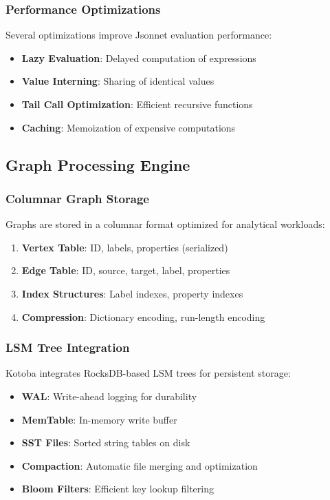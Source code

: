 \documentclass[11pt,a4paper]{article}
\begin{document}
\subsubsection{Performance Optimizations}
\label{subsubsec:jsonnet_performance}

Several optimizations improve Jsonnet evaluation performance:

\begin{itemize}
\item \textbf{Lazy Evaluation}: Delayed computation of expressions
\item \textbf{Value Interning}: Sharing of identical values
\item \textbf{Tail Call Optimization}: Efficient recursive functions
\item \textbf{Caching}: Memoization of expensive computations
\end{itemize}

\subsection{Graph Processing Engine}
\label{subsec:graph_engine}

\subsubsection{Columnar Graph Storage}
\label{subsubsec:columnar_storage}

Graphs are stored in a columnar format optimized for analytical workloads:

\begin{enumerate}
\item \textbf{Vertex Table}: ID, labels, properties (serialized)
\item \textbf{Edge Table}: ID, source, target, label, properties
\item \textbf{Index Structures}: Label indexes, property indexes
\item \textbf{Compression}: Dictionary encoding, run-length encoding
\end{enumerate}

\subsubsection{LSM Tree Integration}
\label{subsubsec:lsm_integration}

Kotoba integrates RocksDB-based LSM trees for persistent storage:

\begin{itemize}
\item \textbf{WAL}: Write-ahead logging for durability
\item \textbf{MemTable}: In-memory write buffer
\item \textbf{SST Files}: Sorted string tables on disk
\item \textbf{Compaction}: Automatic file merging and optimization
\item \textbf{Bloom Filters}: Efficient key lookup filtering
\end{itemize}
\end{document}
